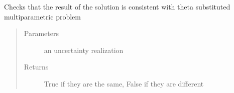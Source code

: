 \documentclass[letterpaper,10pt,english]{sphinxmanual}
\begin{document}
\begin{fulllineitems}
\begin{fulllineitems}
\end{fulllineitems}


\begin{fulllineitems}
\label{\detokenize{mpo:mpo.solution.Solution.program}}
\end{fulllineitems}


\begin{fulllineitems}
\label{\detokenize{mpo:mpo.solution.Solution.verify_solution}}
\end{fulllineitems}


\begin{fulllineitems}
\label{\detokenize{mpo:mpo.solution.Solution.verify_theta}}
\sphinxAtStartPar
Checks that the result of the solution is consistent with theta substituted multiparametric problem
\begin{quote}\begin{description}
\item[{Parameters}] \leavevmode
\sphinxAtStartPar
{} \textendash{} an uncertainty realization

\item[{Returns}] \leavevmode
\sphinxAtStartPar
True if they are the same, False if they are different

\end{description}\end{quote}

\end{fulllineitems}


\end{fulllineitems}
\end{document}
